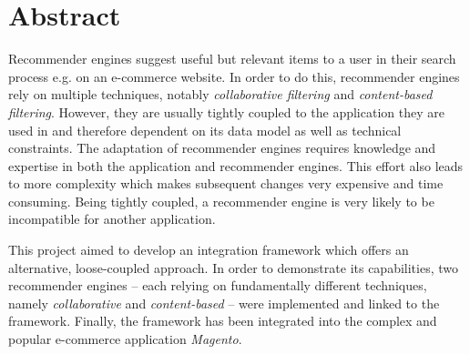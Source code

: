 \chapter*{Abstract}

Recommender engines suggest useful but relevant items to a user in their search process e.g. on an e-commerce website. In order to do this, recommender engines rely on multiple techniques, notably \emph{collaborative filtering} and \emph{content-based filtering}. However, they are usually tightly coupled to the application they are used in and therefore dependent on its data model as well as technical constraints. The adaptation of recommender engines requires knowledge and expertise in both the application and recommender engines. This effort also leads to more complexity which makes subsequent changes very expensive and time consuming. Being tightly coupled, a recommender engine is very likely to be incompatible for another application.

This project aimed to develop an integration framework which offers an alternative, loose-coupled approach. In order to demonstrate its capabilities, two recommender engines -- each relying on fundamentally different techniques, namely \emph{collaborative} and \emph{content-based} -- were  implemented and linked to the framework. Finally, the framework has been integrated into the complex and popular e-commerce application \emph{Magento}.
